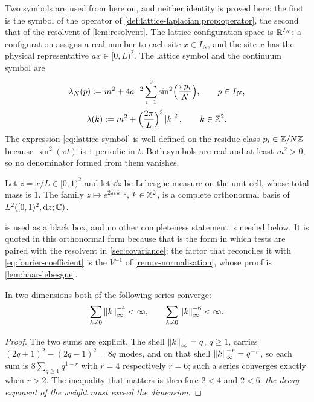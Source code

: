 Two symbols are used from here on, and neither identity is proved here: the
first is the symbol of the operator of
\cref{def:lattice-laplacian,prop:operator}, the second that of the resolvent of
\cref{lem:resolvent}. The lattice configuration space is
$\mathbb{R}^{I_N}$: a configuration assigns a real number to each site $x\in I_N$, and
the site $x$ has the physical representative $ax\in[0,L)^2$. The lattice symbol
and the continuum symbol are
\begin{equation}\label{eq:lattice-symbol}
  \lambda_N(p):=m^2+4a^{-2}\sum_{i=1}^{2}\sin^2\Bigl(\frac{\pi p_i}{N}\Bigr),
  \qquad p\in I_N ,
\end{equation}
\begin{equation}\label{eq:continuum-symbol}
  \lambda(k):=m^2+\Bigl(\frac{2\pi}{L}\Bigr)^{2}\left| k \right|^2 ,
  \qquad k\in\mathbb{Z}^2 .
\end{equation}
The expression \eqref{eq:lattice-symbol} is well defined on the residue class
$p_i\in\mathbb{Z}/N\mathbb{Z}$ because $\sin^2(\pi t)$ is $1$-periodic in $t$. Both symbols are
real and at least $m^2>0$, so no denominator formed from them vanishes.

\begin{external}\label{ext:fourier-basis}
Let $z=x/L\in[0,1)^2$ and let $\dd z$ be Lebesgue measure on the unit cell, whose
total mass is $1$. The family $z\mapsto e^{2\pi i\,k\cdot z}$, $k\in\mathbb{Z}^2$, is a
complete orthonormal basis of $L^2([0,1)^2,\mathrm{d} z;\mathbb{C})$.
\end{external}

 is used as a black box, and no other completeness
statement is needed below. It is quoted in this orthonormal form because that is
the form in which tests are paired with the resolvent in \cref{sec:covariance};
the factor that reconciles it with \eqref{eq:fourier-coefficient} is the
$V^{-1}$ of \cref{rem:v-normalisation}, whose proof is \cref{lem:haar-lebesgue}.

\begin{lemma}\label{ext:summability}
In two dimensions both of the following series converge:
\begin{equation}\label{eq:summability}
  \sum_{k\ne0}\left\| k \right\|_\infty^{-4}<\infty,
  \qquad
  \sum_{k\ne0}\left\| k \right\|_\infty^{-6}<\infty .
\end{equation}\end{lemma}

\begin{proof}
The two sums are explicit. The shell $\left\| k \right\|_\infty=q$, $q\ge1$, carries
$(2q+1)^2-(2q-1)^2=8q$ modes, and on that shell $\left\| k \right\|_\infty^{-r}=q^{-r}$, so
each sum is $8\sum_{q\ge1}q^{1-r}$ with $r=4$ respectively $r=6$; such a series
converges exactly when $r>2$. The inequality that matters is therefore $2<4$ and
$2<6$: \emph{the decay exponent of the weight must exceed the dimension}.
\end{proof}

